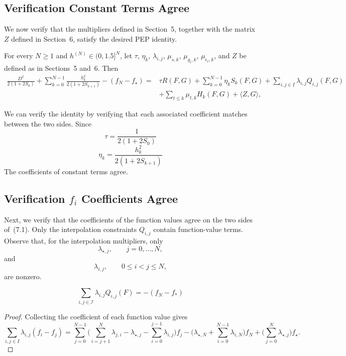 {\color{cyan}

\subsection{Verification Constant Terms Agree}


We now verify that the multipliers defined in Section~5, together with the matrix
$Z$ defined in Section~6, satisfy the desired PEP identity.

\begin{proposition}
For every $N\ge 1$ and $h^{(N)}\in(0,1.5]^N$, let
$\tau$, $\eta_k$, $\lambda_{i,j}$, $\mu_{s,k}$,
$\mu_{g_i,k}$, $\mu_{\epsilon_\ell,k}$, and $Z$
be defined as in Sections~5 and~6. Then
\begin{equation}
\begin{aligned}
\frac{D^2}{2(1+2S_0)}+\sum_{k=0}^{N-1} \frac{h_k^2}{2(1+2S_{k+1})}-(f_N-f_\star)
={}&
\tau R(F,G)
+
\sum_{k=0}^{N-1}\eta_k S_k(F,G)
+
\sum_{i,j\in I}\lambda_{i,j}Q_{i,j}(F,G)
\\
&+
\sum_{t\le k}\mu_{t,k}H_k(F,G)
+
\langle Z,G\rangle,
\end{aligned}
\tag{7.1}
\end{equation}
\end{proposition}

We can verify the identity by verifying that each associated coefficient matches between the two sides.
Since 
\[\tau = \frac{1}{2(1+2S_0)}\]
\[\eta_k = \frac{h_k^2}{2(1+2S_{k+1})}\]
The coefficients of constant terms agree.


\subsection{Verification $f_i$ Coefficients Agree}
Next, we verify that the coefficients of the function values agree on the two sides of~(7.1).
Only the interpolation constraints $Q_{i,j}$ contain function-value terms.
Observe that, for the interpolation multipliers, only
\[\lambda_{\star,j}, \qquad j=0,\ldots,N,\]
and
\[\lambda_{i,j}, \qquad 0\le i<j\le N,\]
are nonzero.
\begin{lemma}
    \[\sum_{i,j\in \mathcal{I}} \lambda_{i,j} Q_{i,j}(F)=-(f_N-f_*)\]
\end{lemma}
\begin{proof}
Collecting the coefficient of each function value gives
\[\sum_{i,j\in I}\lambda_{i,j}(f_i-f_j)=\sum_{j=0}^{N-1}
\Big(\sum_{i=j+1}^{N}\lambda_{j,i}-\lambda_{\star,j}-\sum_{i=0}^{j-1}\lambda_{i,j}\Big)f_j-
\Big(\lambda_{\star,N}+\sum_{i=0}^{N-1}\lambda_{i,N}\Big)f_N
+\Big(\sum_{j=0}^{N}\lambda_{\star,j}\Big)f_\star.\]


\end{proof}}
